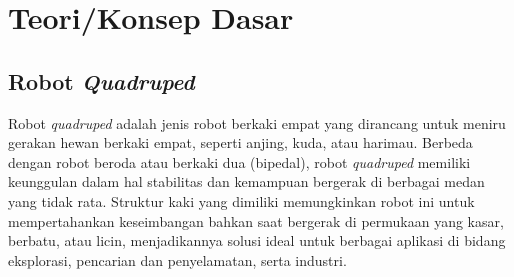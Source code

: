 
\section{Teori/Konsep Dasar}



\subsection{Robot \emph{Quadruped}}

Robot \emph{quadruped} adalah jenis robot berkaki empat yang dirancang untuk meniru gerakan hewan berkaki empat,
seperti anjing, kuda, atau harimau. Berbeda dengan robot beroda atau berkaki dua (bipedal),
robot \emph{quadruped} memiliki keunggulan dalam hal stabilitas dan kemampuan bergerak di berbagai medan yang tidak rata\parencite{AshishMajithia_dmcapoqracr}.
Struktur kaki yang dimiliki memungkinkan robot ini untuk mempertahankan keseimbangan bahkan
saat bergerak di permukaan yang kasar, berbatu, atau licin, menjadikannya solusi ideal untuk
berbagai aplikasi di bidang eksplorasi, pencarian dan penyelamatan, serta industri.

